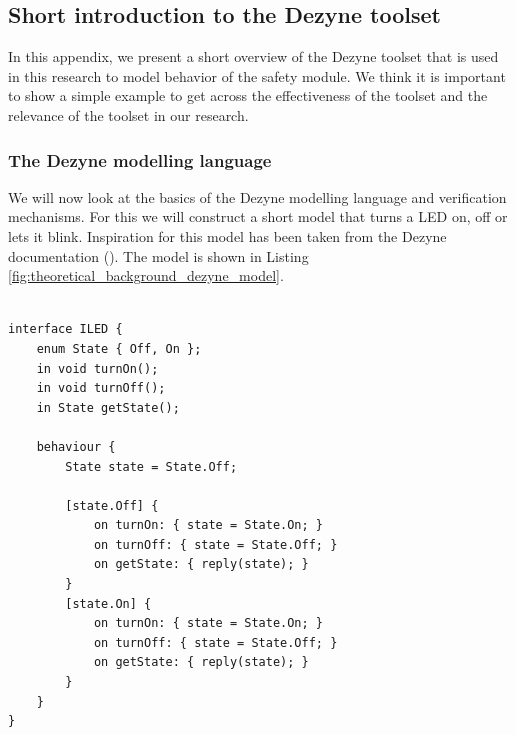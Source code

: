 \documentclass[12pt]{scrreprt}
\begin{document}

\begin{appendices}

\chapter{Short introduction to the Dezyne toolset}
\label{Short introduction to the Dezyne toolset}
In this appendix, we present a short overview of the Dezyne toolset that is used in this research to model behavior of the safety module. We think it is important to show a simple example to get across the effectiveness of the toolset and the relevance of the toolset in our research. 

\subsection{The Dezyne modelling language}
\label{The Dezyne toolset and the Dezyne modelling language}
We will now look at the basics of the Dezyne modelling language and verification mechanisms. For this we will construct a short model that turns a LED on, off or lets it blink. Inspiration for this model has been taken from the Dezyne documentation (\cite{dzntut}). The model is shown in Listing \ref{fig:theoretical_background_dezyne_model}.

\begin{listing}[!ht]
\begin{verbatim}
               
interface ILED {
    enum State { Off, On };
    in void turnOn();
    in void turnOff();
    in State getState();

    behaviour {
        State state = State.Off;

        [state.Off] {
            on turnOn: { state = State.On; }
            on turnOff: { state = State.Off; }
            on getState: { reply(state); }
        }
        [state.On] {
            on turnOn: { state = State.On; }
            on turnOff: { state = State.Off; }
            on getState: { reply(state); }
        }
    }
}


\end{verbatim}
\end{listing}
\end{appendices}
\end{document}
